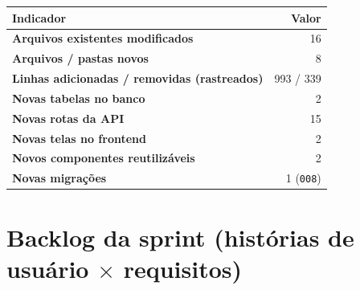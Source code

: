 \documentclass[11pt,a4paper]{article}
\newcommand{\cod}[1]{\texttt{#1}}
\begin{document}
\begin{center}
\begin{tabular}{>{\bfseries}l r}
  \toprule
  Indicador & Valor \\
  \midrule
  Arquivos existentes modificados            & 16 \\
  Arquivos / pastas novos                    & 8 \\
  Linhas adicionadas / removidas (rastreados) & 993 / 339 \\
  Novas tabelas no banco                     & 2 \\
  Novas rotas da API                         & 15 \\
  Novas telas no frontend                    & 2 \\
  Novos componentes reutilizáveis            & 2 \\
  Novas migrações                            & 1 (\cod{008}) \\
  \bottomrule
\end{tabular}
\end{center}

\section{Backlog da sprint (histórias de usuário $\times$ requisitos)}
\end{document}
